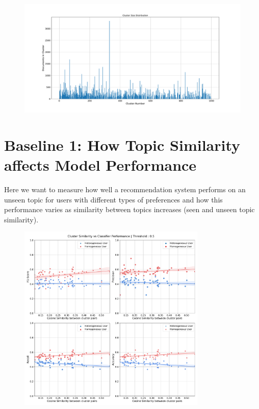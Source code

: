 \documentclass[a4paper,fontsize=9.0pt]{scrartcl}
\begin{document}
\begin{flushleft}
\begin{itemize}
\begin{itemize}
  \end{itemize}
\end{itemize}
\begin{figure}[H]
 \centering
 \includegraphics[width=1.0\textwidth]{Graphs/cluster_size_dist.pdf}
\end{figure}
\end{flushleft}


\newpage
\section{Baseline 1: How Topic Similarity affects Model Performance}
\begin{flushleft}
Here we want to measure how well a recommendation system performs on an unseen topic for users with different types of preferences and how this performance varies as similarity between topics increases (seen and unseen topic similarity).
\end{flushleft}
\vspace{-5ex}
\begin{figure}[H]
 \includegraphics[width=0.8\textwidth]{Graphs/cluster_sim_vs_model_perf_5.pdf}
\end{figure}
\end{document}
